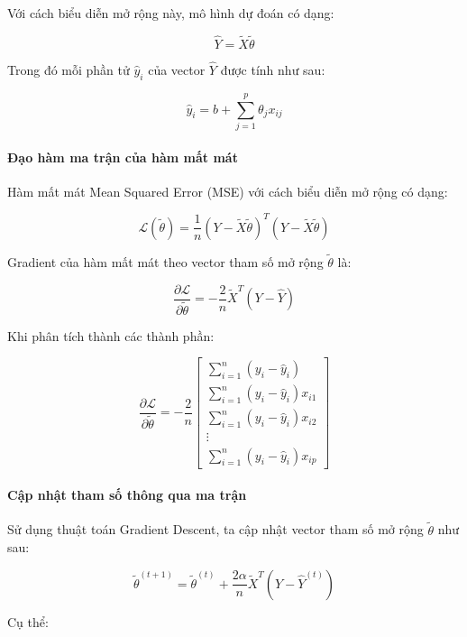 Với cách biểu diễn mở rộng này, mô hình dự đoán có dạng:

\[
    \hat{Y} = \tilde{X}\tilde{\theta}
\]

Trong đó mỗi phần tử \(\hat{y}_i\) của vector \(\hat{Y}\) được tính như sau:

\[
    \hat{y}_i = b + \sum_{j=1}^{p} \theta_j x_{ij}
\]

\paragraph{Đạo hàm ma trận của hàm mất mát}
Hàm mất mát Mean Squared Error (MSE) với cách biểu diễn mở rộng có dạng:

\[
    \mathcal{L}(\tilde{\theta}) = \frac{1}{n} (Y - \tilde{X}\tilde{\theta})^T (Y - \tilde{X}\tilde{\theta})
\]

Gradient của hàm mất mát theo vector tham số mở rộng \(\tilde{\theta}\) là:

\[
    \frac{\partial \mathcal{L}}{\partial \tilde{\theta}} = -\frac{2}{n} \tilde{X}^T(Y - \hat{Y})
\]

Khi phân tích thành các thành phần:

\[
    \frac{\partial \mathcal{L}}{\partial \tilde{\theta}} = -\frac{2}{n} 
    \begin{bmatrix}
        \sum_{i=1}^n (y_i - \hat{y}_i) \\
        \sum_{i=1}^n (y_i - \hat{y}_i)x_{i1} \\
        \sum_{i=1}^n (y_i - \hat{y}_i)x_{i2} \\
        \vdots \\
        \sum_{i=1}^n (y_i - \hat{y}_i)x_{ip}
    \end{bmatrix}
\]

\paragraph{Cập nhật tham số thông qua ma trận}
Sử dụng thuật toán Gradient Descent, ta cập nhật vector tham số mở rộng \(\tilde{\theta}\) như sau:

\[
    \tilde{\theta}^{(t+1)} = \tilde{\theta}^{(t)} + \frac{2\alpha}{n} \tilde{X}^T(Y - \hat{Y}^{(t)})
\]

Cụ thể:

